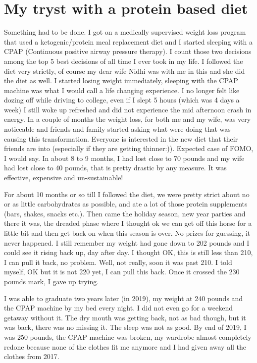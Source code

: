 \documentclass[
  oneside]{book}
\begin{document}
\hypertarget{my-tryst-with-a-protein-based-diet}{%
\section{My tryst with a protein based diet}\label{my-tryst-with-a-protein-based-diet}}

Something had to be done. I got on a medically supervised weight loss program that used a ketogenic/protein meal replacement diet and I started sleeping with a CPAP (Continuous positive airway pressure therapy). I count those two decisions among the top 5 best decisions of all time I ever took in my life. I followed the diet very strictly, of course my dear wife Nidhi was with me in this and she did the diet as well. I started losing weight immediately, sleeping with the CPAP machine was what I would call a life changing experience. I no longer felt like dozing off while driving to college, even if I slept 5 hours (which was 4 days a week) I still woke up refreshed and did not experience the mid afternoon crash in energy. In a couple of months the weight loss, for both me and my wife, was very noticeable and friends and family started asking what were doing that was causing this transformation. Everyone is interested in the new diet that their friends are into (especially if they are getting thinner:)). Expected case of FOMO, I would say. In about 8 to 9 months, I had lost close to 70 pounds and my wife had lost close to 40 pounds, that is pretty drastic by any measure. It was effective, expensive and un-sustainable!

For about 10 months or so till I followed the diet, we were pretty strict about no or as little carbohydrates as possible, and ate a lot of those protein supplements (bars, shakes, snacks etc.). Then came the holiday season, new year parties and there it was, the dreaded phase where I thought ok we can get off this horse for a little bit and then get back on when this season is over. No prizes for guessing, it never happened. I still remember my weight had gone down to 202 pounds and I could see it rising back up, day after day. I thought OK, this is still less than 210, I can pull it back, no problem. Well, not really, soon it was past 210. I told myself, OK but it is not 220 yet, I can pull this back. Once it crossed the 230 pounds mark, I gave up trying.

I was able to graduate two years later (in 2019), my weight at 240 pounds and the CPAP machine by my bed every night. I did not even go for a weekend getaway without it. The dry mouth was getting back, not as bad though, but it was back, there was no missing it. The sleep was not as good. By end of 2019, I was 250 pounds, the CPAP machine was broken, my wardrobe almost completely redone because none of the clothes fit me anymore and I had given away all the clothes from 2017.
\end{document}
